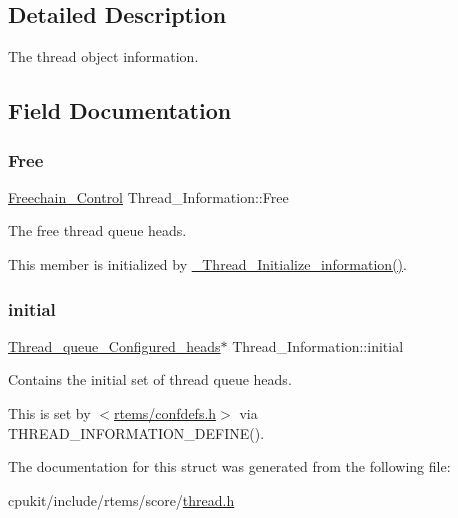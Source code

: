 \subsection{Detailed Description}
The thread object information. 

\subsection{Field Documentation}
\mbox{\label{structThread__Information_a3c28243117c72aed1fe9320944e74639}} 
\subsubsection{\texorpdfstring{Free}{Free}}
{\footnotesize\ttfamily \mbox{\hyperlink{structFreechain__Control}{Freechain\+\_\+\+Control}} Thread\+\_\+\+Information\+::\+Free}



The free thread queue heads. 

This member is initialized by \mbox{\hyperlink{group__RTEMSScoreThread_gacd86ef6b0e5fb19ec14d7fe51e3868e2}{\+\_\+\+Thread\+\_\+\+Initialize\+\_\+information()}}. \mbox{\label{structThread__Information_ae4f6930be231a8d7bb4e406859938f01}} 
\subsubsection{\texorpdfstring{initial}{initial}}
{\footnotesize\ttfamily \mbox{\hyperlink{group__RTEMSScoreThread_gac2edd6c043930e8159685c0cb2e19ca7}{Thread\+\_\+queue\+\_\+\+Configured\+\_\+heads}}$\ast$ Thread\+\_\+\+Information\+::initial}



Contains the initial set of thread queue heads. 

This is set by $<$\mbox{\hyperlink{confdefs_8h}{rtems/confdefs.\+h}}$>$ via T\+H\+R\+E\+A\+D\+\_\+\+I\+N\+F\+O\+R\+M\+A\+T\+I\+O\+N\+\_\+\+D\+E\+F\+I\+N\+E(). 

The documentation for this struct was generated from the following file\+:\begin{DoxyCompactItemize}
\item 
cpukit/include/rtems/score/\mbox{\hyperlink{score_2thread_8h}{thread.\+h}}\end{DoxyCompactItemize}
